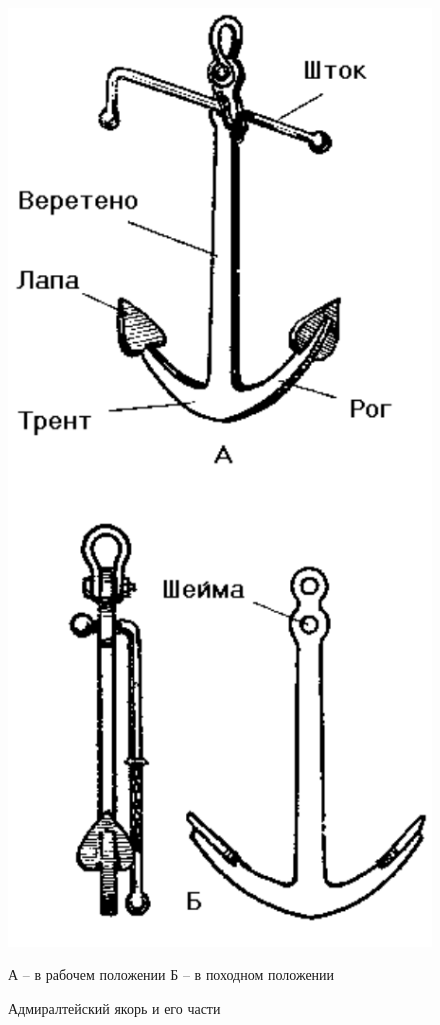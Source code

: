 \documentclass[a4paper, 12pt, twoside, final]{scrbook}
\begin{document}
\begin{figure}
   \centering
   \includegraphics{pics/52_Admiraltejskij_jakor} %
   \caption{Адмиралтейский якорь и его части}
   \label{fig:52}
   \centering \small
   А \--- в рабочем положении Б \--- в походном положении
\end{figure}
\end{document}
